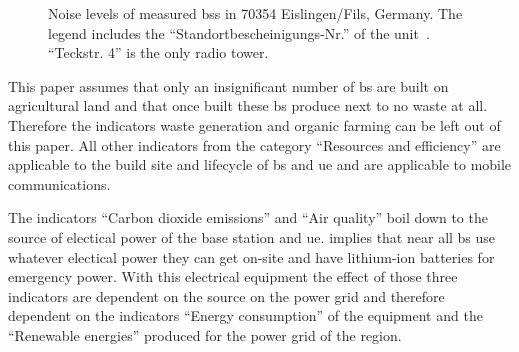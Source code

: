 \documentclass[11pt,a4paper]{article}
\begin{document}
\begin{figure}[h]
  \centering
  \caption{Noise levels of measured \acrshort{bs}s in 70354 Eislingen/Fils, Germany. The legend includes the \enquote{Standortbescheinigungs-Nr.} of the unit~\citep{EMFKarte}. \enquote{Teckstr. 4} is the only radio tower.}\label{fig:noise-measurements}
\end{figure}

This paper assumes that only an insignificant number of \acrshort{bs} are built on agricultural land and that once built these \acrshort{bs} produce next to no waste at all.
Therefore the indicators waste generation and organic farming can be left out of this paper.
All other indicators from the category \enquote{Resources and efficiency} are applicable to the build site and lifecycle of \acrshort{bs} and \acrshort{ue} and are applicable to mobile communications.

The indicators \enquote{Carbon dioxide emissions} and \enquote{Air quality} boil down to the source of electical power of the base station and \acrshort{ue}.
\citep{powerwhitepaper} implies that near all \acrshort{bs} use whatever electical power they can get on-site and have lithium-ion batteries for emergency power.
With this electrical equipment the effect of those three indicators are dependent on the source on the power grid and therefore dependent on the indicators \enquote{Energy consumption} of the equipment and the \enquote{Renewable energies} produced for the power grid of the region.
\end{document}
